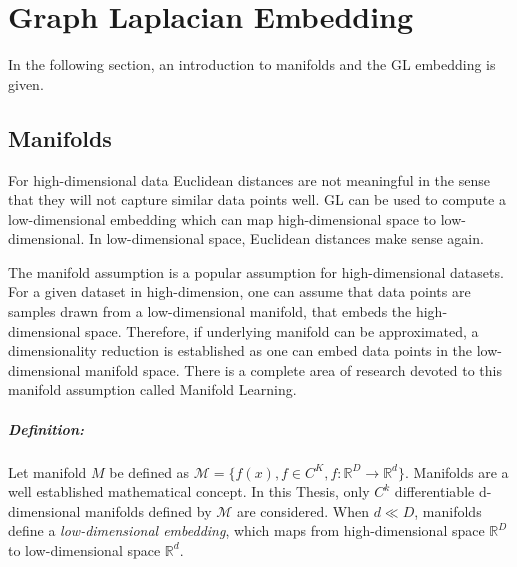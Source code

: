 \chapter{Graph Laplacian Embedding}
In the following section, an introduction to manifolds and the GL embedding is given.

\section{Manifolds}
\label{sec:manifolds}



For high-dimensional data Euclidean distances are not meaningful in the sense that they will not capture similar data points well. 
GL can be used to compute a low-dimensional embedding which can map high-dimensional space to low-dimensional.
In low-dimensional space, Euclidean distances make sense again. 

The manifold assumption is a popular assumption for high-dimensional datasets.
For a given dataset in high-dimension, one can assume that data points are samples drawn from a low-dimensional manifold,
that embeds the high-dimensional space. 
Therefore, if underlying manifold can be approximated, a dimensionality reduction
is established as one can embed data points in the low-dimensional manifold space.
There is a complete area of research devoted to this manifold assumption called Manifold Learning\cite{ManifoldLearning}.

\paragraph{Definition:}
Let manifold $M$ be defined as $\mathcal{M} = \{ f(x), f \in C^K, f: \mathbb{R}^D \to \mathbb{R}^d \}$.
Manifolds are a well established mathematical concept. In this Thesis, only 
$C^k$ differentiable d-dimensional manifolds defined by $\mathcal{M}$ are considered. 
When $d \ll D$, manifolds define a \textit{low-dimensional embedding}, which maps from high-dimensional space 
$\mathbb{R}^D$ to low-dimensional space $\mathbb{R}^d$.

